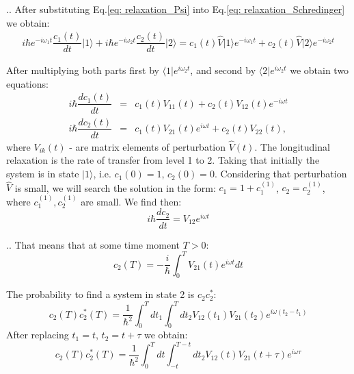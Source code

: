 \documentclass[handout]{beamer}
\begin{document}
\begin{frame}{\thesection.\thesubsection. \insertsubsection}
	  After substituting Eq.\ref{eq: relaxation_Psi} into Eq.\ref{eq: relaxation_Schredinger} we obtain:
	  \begin{align}
	  i\hbar e^{-i \omega_1 t} \dfrac{c_1(t)}{d t} \vert 1 \rangle + i\hbar e^{-i \omega_2 t} \dfrac{c_2(t)}{d t} \vert 2 \rangle = c_1(t) \hat{V} \vert 1 \rangle e^{-i \omega_1 t} + c_2(t) \hat{V} \vert 2 \rangle e^{-i \omega_2 t}
	  \end{align}
	
	
	After multiplying both parts first by $\langle 1 \vert e^{i \omega_2 t}$, and second by $\langle 2 \vert e^{i \omega_2 t}$ we obtain two equations:
	\begin{equation}
	  \begin{array}{lcl}
         i \hbar \dfrac{d c_1(t)}{d t} &=& c_1(t) V_{11}(t) + c_2(t)V_{12}(t) e^{-i \omega t} \\
         i \hbar \dfrac{d c_2(t)}{d t} &=& c_1(t) V_{21}(t)  e^{ i \omega t} + c_2(t)V_{22}(t),
	  \end{array}
	\end{equation}
	where $V_{ik}(t)$ - are matrix elements of perturbation $\hat{V}(t)$. The longitudinal relaxation is the rate of transfer from level 1 to 2. Taking that initially the system is in state $\vert 1 \rangle$, i.e. $c_1(0)=1$, $c_2(0)=0$. Considering that perturbation $\hat{V}$ is small, we will search the solution in the form: $c_1 = 1 + c_1^{(1)}$, $c_2 = c_2^{(1)}$, where $c_1^{(1)}, c_2^{(1)}$ are small. We find then:
	\begin{equation}
	    i \hbar \dfrac{d c_2}{d t}  = V_{12} e^{i \omega t}	    
	\end{equation}
	


\end{frame}

\begin{frame}{\thesection.\thesubsection. \insertsubsection}
		That means that at some time moment $T > 0$:
		\begin{equation}
		c_2(T) = - \dfrac{i}{\hbar} \int_{0}^{T} V_{21}(t) e^{i \omega t} dt
		\end{equation}
	
	The probability to find a system in state 2 is $c_2 c_2^*$:
	\begin{equation}
	   c_2(T) c_2^*(T) = \dfrac{1}{\hbar^2} \int_{0}^{T} dt_1 \int_{0}^{T} dt_2 V_{12}(t_1) V_{21}(t_2) e^{i \omega (t_2-t_1)}
	\end{equation}
	After replacing $t_1 = t$, $t_2 = t+ \tau$ we obtain:
	\begin{equation}
	   c_2(T) c_2^*(T) = \dfrac{1}{\hbar^2} \int_{0}^{T} dt \int_{-t}^{T-t} dt_2 V_{12}(t) V_{21}(t+ \tau) e^{i \omega \tau}
	\end{equation}
	

	
\end{frame}
\end{document}
